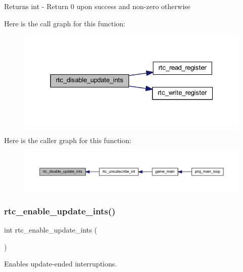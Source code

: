 \begin{DoxyReturn}{Returns}
int -\/ Return 0 upon success and non-\/zero otherwise 
\end{DoxyReturn}
Here is the call graph for this function\+:
\nopagebreak
\begin{figure}[H]
\begin{center}
\leavevmode
\includegraphics[width=326pt]{group__rtc_ga6222d2da81f961f574c428db117e610e_cgraph}
\end{center}
\end{figure}
Here is the caller graph for this function\+:
\nopagebreak
\begin{figure}[H]
\begin{center}
\leavevmode
\includegraphics[width=350pt]{group__rtc_ga6222d2da81f961f574c428db117e610e_icgraph}
\end{center}
\end{figure}
\mbox{\label{group__rtc_ga33036209deeaa3ca32027fdab0c8b2d7}} 
\subsubsection{\texorpdfstring{rtc\+\_\+enable\+\_\+update\+\_\+ints()}{rtc\_enable\_update\_ints()}}
{\footnotesize\ttfamily int rtc\+\_\+enable\+\_\+update\+\_\+ints (\begin{DoxyParamCaption}{ }\end{DoxyParamCaption})}



Enables update-\/ended interruptions. 

